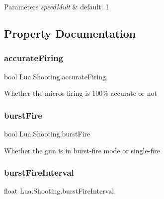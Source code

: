 \begin{DoxyParams}{Parameters}
{\em speed\+Mult} & default\+: 1\\
\hline
\end{DoxyParams}


\subsection{Property Documentation}
\mbox{\label{class_lua_1_1_shooting_af30c3a5b6caca44684fcd88ac7f7f4a7}} 
\subsubsection{\texorpdfstring{accurateFiring}{accurateFiring}}
{\footnotesize\ttfamily bool Lua.\+Shooting.\+accurate\+Firing\hspace{0.3cm}{\ttfamily [get]}, {\ttfamily [set]}}



Whether the micro\textquotesingle{}s firing is 100\% accurate or not 

\mbox{\label{class_lua_1_1_shooting_a6ddbbd79abebeb560511e7c00093fb1a}} 
\subsubsection{\texorpdfstring{burstFire}{burstFire}}
{\footnotesize\ttfamily bool Lua.\+Shooting.\+burst\+Fire\hspace{0.3cm}{\ttfamily [get]}}



Whether the gun is in burst-\/fire mode or single-\/fire 

\mbox{\label{class_lua_1_1_shooting_a51b27960d8f74262edb79dc173f75670}} 
\subsubsection{\texorpdfstring{burstFireInterval}{burstFireInterval}}
{\footnotesize\ttfamily float Lua.\+Shooting.\+burst\+Fire\+Interval\hspace{0.3cm}{\ttfamily [get]}, {\ttfamily [set]}}



